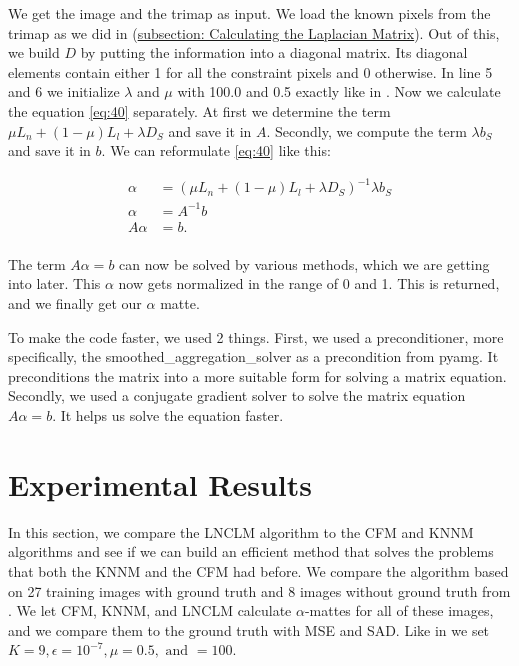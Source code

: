 We get the image and the trimap as input. We load the known pixels from the trimap as we did in (\hyperref[subsec:laplace]{subsection: Calculating the Laplacian Matrix}). Out of this, we build \(D\) by putting the information into a diagonal matrix. Its diagonal elements contain either 1 for all the constraint pixels and 0 otherwise. 
In line 5 and 6 we initialize \(\lambda\) and \(\mu\) with 100.0 and 0.5 exactly like in \cite{lnclm}. Now we calculate the equation \ref{eq:40} separately. At first we determine the term \(\mu L_n + (1 - \mu) L_l + \lambda D_S\) and save it in \(A\). Secondly, we compute the term \(\lambda b_S\) and save it in \(b\). We can reformulate  \ref{eq:40} like this:

\begin{align}
	\alpha &= (\mu L_n + (1 - \mu) L_l + \lambda D_S)^{-1} \lambda b_S \\
	\alpha &= A^{-1} b\\
	A \alpha &= b.\\
\end{align} 

The term \(A \alpha = b \) can now be solved by various methods, which we are getting into later. This \(\alpha\) now gets normalized in the range of 0 and 1. This is returned, and we finally get our $\alpha$ matte.

To make the code faster, we used 2 things. First, we used a preconditioner, more specifically, the smoothed\_aggregation\_solver as a precondition from pyamg. It preconditions the matrix into a more suitable form for solving a matrix equation. Secondly, we used a conjugate gradient solver to solve the matrix equation \(A \alpha = b\). It helps us solve the equation faster. 



\section{Experimental Results}
In this section, we compare the LNCLM algorithm to the CFM and KNNM algorithms and see if we can build an efficient method that solves the problems that both the KNNM and the CFM had before. We compare the algorithm based on 27 training images with ground truth and 8 images without ground truth from \cite{benchmark}. We let CFM, KNNM, and LNCLM calculate $\alpha$-mattes for all of these images, and we compare them to the ground truth with MSE and SAD. Like in \cite{lnclm} we set \(K = 9, \epsilon = 10^{-7}, \mu = 0.5, \text{ and }  = 100\).

